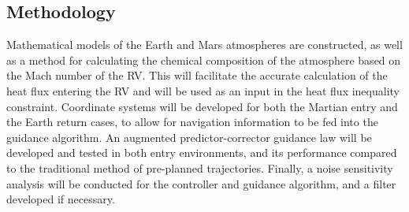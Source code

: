 \documentclass[12pt]{article}
\numberwithin{equation}{section}
\numberwithin{figure}{section}
\numberwithin{table}{section}
\begin{document}
\subsection{Methodology}
Mathematical models of the Earth and Mars atmospheres are constructed, as well as a method for calculating the chemical composition of the atmosphere based on the Mach number of the RV. This will facilitate the accurate calculation of the heat flux entering the RV and will be used as an input in the heat flux inequality constraint. Coordinate systems will be developed for both the Martian entry and the Earth return cases, to allow for navigation information to be fed into the guidance algorithm. An augmented predictor-corrector guidance law will be developed and tested in both entry environments, and its performance compared to the traditional method of pre-planned trajectories. Finally, a noise sensitivity analysis will be conducted for the controller and guidance algorithm, and a filter developed if necessary.

\nocite{*}

\end{document}
